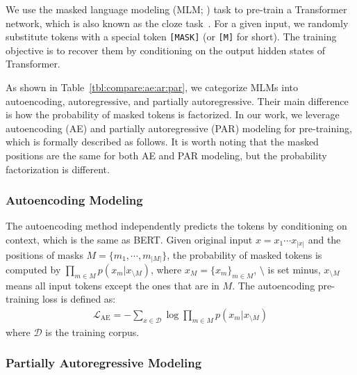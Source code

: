 \documentclass{article}
\newcommand{\sptk}[1]{\texttt{[#1]}}
\begin{document}
We use the masked language modeling (MLM; \citealt{bert}) task to pre-train a Transformer network, which is also known as the cloze task~\cite{taylor1953cloze}.
For a given input, we randomly substitute tokens with a special token \sptk{MASK} (or \sptk{M} for short). The training objective is to recover them by conditioning on the output hidden states of Transformer.


As shown in Table~\ref{tbl:compare:ae:ar:par}, we categorize MLMs into autoencoding, autoregressive, and partially autoregressive.
Their main difference is how the probability of masked tokens is factorized.
In our work, we leverage autoencoding (AE) and partially autoregressive (PAR) modeling for pre-training, which is formally described as follows.
It is worth noting that the masked positions are the same for both AE and PAR modeling, but the probability factorization is different.


\subsubsection{Autoencoding Modeling}
\label{sec:ae}

The autoencoding method independently predicts the tokens by conditioning on context, which is the same as BERT.
Given original input $x=x_1 \cdots x_{|x|}$ and the positions of masks $M=\{m_1 , \cdots , m_{|M|}\}$, the probability of masked tokens is computed by $\prod_{ m \in M }{ p( x_m |x_{\setminus M} ) }$, where $x_M=\{x_m\}_{m \in M}$, $\setminus$ is set minus, $x_{\setminus M}$ means all input tokens except the ones that are in $M$.
The autoencoding pre-training loss is defined as:
\begin{align}
\mathcal{L}_{\text{AE}} = -{\sum_{x\in \mathcal{D}}{\log{\prod_{ m \in M }{ p( x_m |x_{\setminus M} ) }}}} \label{eq:objective:ae}
\end{align}
where $\mathcal{D}$ is the training corpus.


\subsubsection{Partially Autoregressive Modeling}
\label{sec:par}
\end{document}
